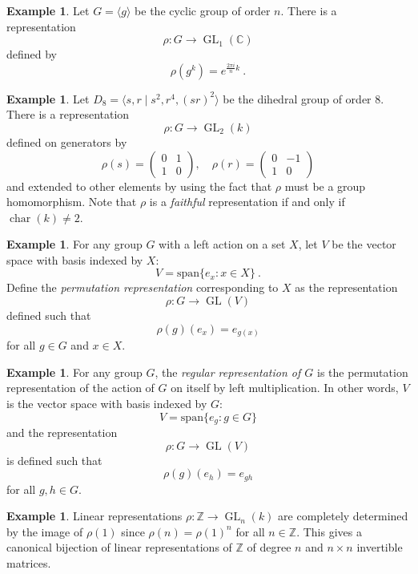 \documentclass[12pt]{article}
\theoremstyle{plain}
\theoremstyle{definition}
\newtheorem{example}[theorem]{Example}
\theoremstyle{remark}
\numberwithin{equation}{section}
\begin{document}
\begin{example}
Let $G = \langle g \rangle$ be the cyclic group of order $n$.
There is a representation
\[ \rho : G \to \operatorname{GL}_1(\mathbb{C}) \]
defined by
\[
\rho(g^k)=e^{\frac{2\pi i}{n}k} \ .
\]
\end{example}

\begin{example}
Let $D_8 = \langle s,r \mid s^2, r^4, (sr)^2 \rangle$
be the dihedral group of order $8$.
There is a representation
\[ \rho : G \to \operatorname{GL}_2(k) \]
defined on generators by
\[
\rho(s)=\begin{pmatrix} 0&1\\1&0 \end{pmatrix} ,\quad
\rho(r)=\begin{pmatrix} 0&-1\\1&0 \end{pmatrix}
\]
and extended to other elements by using the fact that $\rho$
must be a group homomorphism.
Note that $\rho$ is a \emph{faithful} representation if and only if
$\operatorname{char}(k) \ne 2$.
\end{example}


\begin{example}
For any group $G$ with a left action on a set $X$,
let $V$ be the vector space with basis indexed by $X$:
\[
V = \mathrm{span} \{ e_x : x \in X \} \ .
\]
Define the \emph{permutation representation} corresponding to $X$
as the representation
\[
\rho : G \to \operatorname{GL}(V)
\]
defined such that
\[
\rho(g)(e_x) = e_{g(x)}
\]
for all $g \in G$ and $x \in X$.
\end{example}

\begin{example}
For any group $G$, the \emph{regular representation of $G$}
is the permutation representation of the action of $G$ on itself by left
multiplication.
In other words, 
$V$ is the vector space with basis indexed by $G$:
\[
V = \mathrm{span} \{ e_g : g \in G \}
\]
and the representation
\[
\rho : G \to \operatorname{GL}(V)
\]
is defined such that
\[
\rho(g)(e_h) = e_{gh}
\]
for all $g,h \in G$.
\end{example}

\begin{example} \label{ex:lin_alg_is_Z_rep_theory}
Linear representations $\rho : \mathbb{Z} \to \operatorname{GL}_n(k)$
are completely determined by the image of $\rho(1)$
since $\rho(n)=\rho(1)^n$ for all $n \in \mathbb{Z}$.
This gives a canonical bijection of linear representations of
$\mathbb{Z}$ of degree $n$ and
$n \times n$ invertible matrices.
\end{example}
\end{document}
